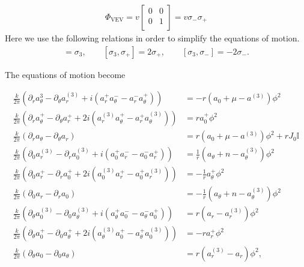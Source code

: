     \begin{align}
    \Phi_{\text{VEV}} = v \begin{bmatrix}
        0&0\\
        0&1\\
    \end{bmatrix} = v \sigma_- \sigma_+
    \end{align}
    Here we use the following relations in order to simplify the equations of motion.
    \begin{align}
        [\sigma_+, \sigma_-] = \sigma_3, \qquad [\sigma_3, \sigma_+] = 2 \sigma_+, \qquad [\sigma_3, \sigma_-] = -2 \sigma_-.
    \end{align}

    The equations of motion become

    \begin{align}
        \frac{k}{2 \pi} \left(\partial_{r} a_{\theta}^3 - \partial_{\theta} a_r^{(3)} + i \left(a_r^+ a_{\theta}^- - a_r^- a_{\theta}^{+} \right) \right) &= -r \left( a_0 + \mu - a^{(3)} \right)\phi^2 \\
        \frac{k}{2 \pi} \left(\partial_r a_{\theta}^{+} - \partial_{\theta} a_r^{+} +2i \left(a_r^{(3)} a_{\theta}^{+} - a_r^{+} a_{\theta}^{(3)} \right) \right) &=r a_0^{+} \phi^2  \\
        \frac{k}{2 \pi} \left(\partial_r a_{\theta} - \partial_{\theta} a_r \right) &=r \left(a_0 +\mu - a^{(3)} \right) \phi^2 + r J_0 \mathbb{I} \\
        \frac{k}{2 \pi}\left(\partial_{0}a_r^{(3)} - \partial_r a_0^{(3)} + i \left(a_0^+ a_r^- - a_0^- a_r^+  \right)  \right) &= \frac{1}{r} \left(a_{\theta}+n - a_{\theta}^{(3)} \right) \phi^2  \\
        \frac{k}{2 \pi} \left( \partial_0 a_r^+ - \partial_r a_0^+ + 2i \left( a_0^{(3)} a_r^+ -a_0^+ a_r^{(3)} \right) \right) &= -\frac{1}{r} a_{\theta}^+ \phi^2  \\
        \frac{k}{2 \pi} \left( \partial_0 a_r - \partial_r a_0 \right) &= -\frac{1}{r} \left(a_{\theta} +n - a_{\theta}^{(3)} \right) \phi^2 \\
        \frac{k}{2 \pi} \left(\partial_{\theta} a_0^{(3)} - \partial_0 a_{\theta}^{(3)} + i \left(a_{\theta}^+ a_0^- - a_{\theta}^- a_0^{+} \right) \right) &= r \left(a_r - a_r^{(3)}  \right) \phi^2 \\
        \frac{k}{2 \pi} \left(\partial_{\theta} a_0^+ - \partial_0 a_{\theta}^+ + 2i \left(a_{\theta}^{(3)} a_0^+ - a_{\theta}^+ a_0^{(3)} \right) \right) &=-r a_r^+ \phi^2\\
        \frac{k}{2 \pi} \left(\partial_{\theta}a_0 -\partial_{0} a_{\theta} \right) &= r \left(a_r^{(3)}- a_r \right) \phi^2,
    \end{align}

